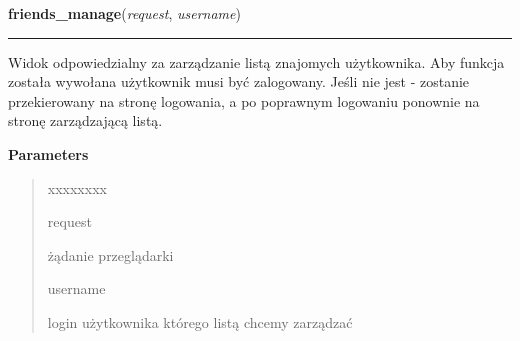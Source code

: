 \hspace{.8\funcindent}\begin{boxedminipage}{\funcwidth}

    \raggedright \textbf{friends\_manage}(\textit{request}, \textit{username})

    \vspace{-1.5ex}

    \rule{\textwidth}{0.5\fboxrule}
\setlength{\parskip}{2ex}
    Widok odpowiedzialny za zarządzanie listą znajomych użytkownika. Aby 
    funkcja została wywołana użytkownik musi być zalogowany. Jeśli nie jest
    - zostanie przekierowany na stronę logowania, a po poprawnym logowaniu 
    ponownie na stronę zarządzającą listą.

\setlength{\parskip}{1ex}
      \textbf{Parameters}
      \vspace{-1ex}

      \begin{quote}
        \begin{Ventry}{xxxxxxxx}

          \item[request]

          żądanie przeglądarki

          \item[username]

          login użytkownika którego listą chcemy zarządzać

        \end{Ventry}

      \end{quote}

    \end{boxedminipage}

    \label{ass8_portal:friends:views:friend_list}

    \vspace{0.5ex}

